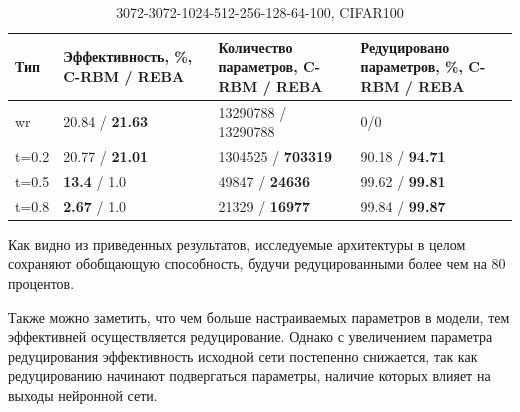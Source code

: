 \begin{table} [!h]
  \small
  \caption{3072-3072-1024-512-256-128-64-100, CIFAR100}\label{table:cifar_100}
\centering
\begin{tabular}{| p{2cm} | p{4cm} | p{4cm} | p{4cm} |}
  \hline
    \textbf{Тип} & \textbf{Эффективность, \%, C-RBM / REBA} & \textbf{Количество параметров, C-RBM / REBA} & \textbf{Редуцировано параметров, \%, C-RBM / REBA}\\
    \hline
    wr & 20.84 / \textbf{21.63} & 13290788 / 13290788 & 0/0\\
    \hline
    t=0.2 & 20.77 / \textbf{21.01} & 1304525 / \textbf{703319} & 90.18 / \textbf{94.71}\\
    \hline
    t=0.5 & \textbf{13.4} / 1.0 & 49847 / \textbf{24636} & 99.62 / \textbf{99.81}\\
    \hline
    t=0.8 & \textbf{2.67} / 1.0 & 21329 / \textbf{16977} & 99.84 / \textbf{99.87}\\
    \hline
\end{tabular}
\end{table}

Как видно из приведенных результатов, исследуемые архитектуры в целом сохраняют обобщающую способность, будучи редуцированными более чем на 80 процентов.

Также можно заметить, что чем больше настраиваемых параметров в модели, тем эффективней осуществляется редуцирование. Однако с увеличением параметра редуцирования эффективность исходной сети постепенно снижается, так как редуцированию начинают подвергаться параметры, наличие которых влияет на выходы нейронной сети.

